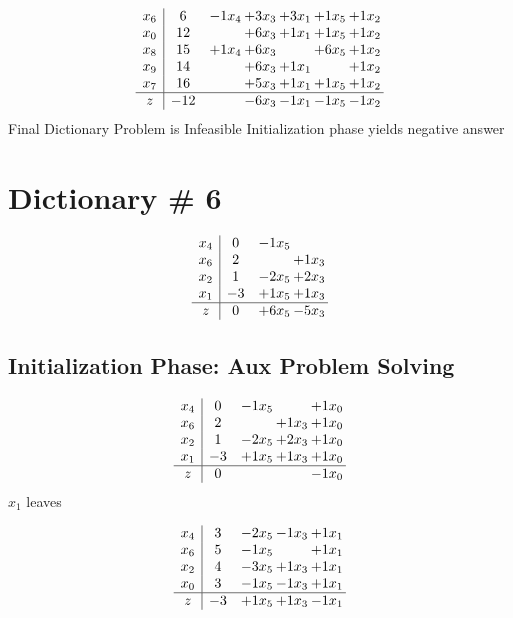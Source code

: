 \documentclass[12pt]{article}
\begin{document}
 \[\begin{array}{c| c c@{\hskip 2pt} c@{\hskip 2pt} c@{\hskip 2pt} c@{\hskip 2pt} c@{\hskip 2pt} }
 x_{6}   &  6 & -1 x_{4} & + 3 x_{3} & + 3 x_{1} & + 1 x_{5} & + 1 x_{2}\\
 x_{0}   &  12  &   & + 6 x_{3} & + 1 x_{1} & + 1 x_{5} & + 1 x_{2}\\
 x_{8}   &  15 & + 1 x_{4} & + 6 x_{3} &   & + 6 x_{5} & + 1 x_{2}\\
 x_{9}   &  14  &   & + 6 x_{3} & + 1 x_{1} &   & + 1 x_{2}\\
 x_{7}   &  16  &   & + 5 x_{3} & + 1 x_{1} & + 1 x_{5} & + 1 x_{2}\\
\hline
z    &  -12  &   & -6 x_{3} & -1 x_{1} & -1 x_{5} & -1 x_{2}\\
\end{array}\]
Final Dictionary
Problem is Infeasible Initialization phase yields negative answer 


\section{Dictionary \# 6}
\[\begin{array}{c| c c@{\hskip 2pt} c@{\hskip 2pt} }
 x_{4}   &  0 & -1 x_{5} &   \\
 x_{6}   &  2  &   & + 1 x_{3}\\
 x_{2}   &  1 & -2 x_{5} & + 2 x_{3}\\
 x_{1}   &  -3 & + 1 x_{5} & + 1 x_{3}\\
\hline
z    &  0 & + 6 x_{5} & -5 x_{3}\\
\end{array}\]
\subsection{Initialization Phase: Aux Problem Solving}
\[\begin{array}{c| c c@{\hskip 2pt} c@{\hskip 2pt} c@{\hskip 2pt} }
 x_{4}   &  0 & -1 x_{5} &   & + 1 x_{0}\\
 x_{6}   &  2  &   & + 1 x_{3} & + 1 x_{0}\\
 x_{2}   &  1 & -2 x_{5} & + 2 x_{3} & + 1 x_{0}\\
 x_{1}   &  -3 & + 1 x_{5} & + 1 x_{3} & + 1 x_{0}\\
\hline
z    &  0  &    &   & -1 x_{0}\\
\end{array}\]
$ x_{1} $ leaves 

 \[\begin{array}{c| c c@{\hskip 2pt} c@{\hskip 2pt} c@{\hskip 2pt} }
 x_{4}   &  3 & -2 x_{5} & -1 x_{3} & + 1 x_{1}\\
 x_{6}   &  5 & -1 x_{5} &   & + 1 x_{1}\\
 x_{2}   &  4 & -3 x_{5} & + 1 x_{3} & + 1 x_{1}\\
 x_{0}   &  3 & -1 x_{5} & -1 x_{3} & + 1 x_{1}\\
\hline
z    &  -3 & + 1 x_{5} & + 1 x_{3} & -1 x_{1}\\
\end{array}\]
\end{document}
